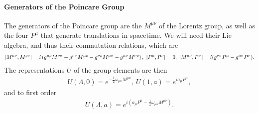 \paragraph{Generators of the Poincare Group}
The generators of the Poincare group are the $M^{\mu\nu}$ of the Lorentz group, as well as the four $P^{\mu}$ that generate translations in spacetime. We will need their Lie algebra, and thus their commutation relations, which are
\begin{align*}
	\comm{M^{\mu\nu}}{M^{\rho\sigma}} = i\left(g^{\mu\rho}M^{\nu\sigma} + g^{\nu\sigma}M^{\mu\rho} - g^{\nu\rho}M^{\mu\sigma} - g^{\mu\sigma}M^{\nu\rho}\right),\ \comm{P^{\mu}}{P^{\nu}} = 0,\ \comm{M^{\mu\nu}}{P^{\sigma}} = i(g^{\nu\sigma}P^{\mu} - g^{\mu\sigma}P^{\nu}).
\end{align*}
The representations $U$ of the group elements are then
\begin{align*}
	U(\Lambda, 0) = e^{-\frac{i}{2}\omega_{\mu\nu}M^{\mu\nu}},\ U(1, a) = e^{ia_{\mu}P^{\mu}},
\end{align*}
and to first order
\begin{align*}
	U(\Lambda, a) = e^{i\left(a_{\mu}P^{\mu} - \frac{1}{2}\omega_{\mu\nu}M^{\mu\nu}\right)}.
\end{align*}